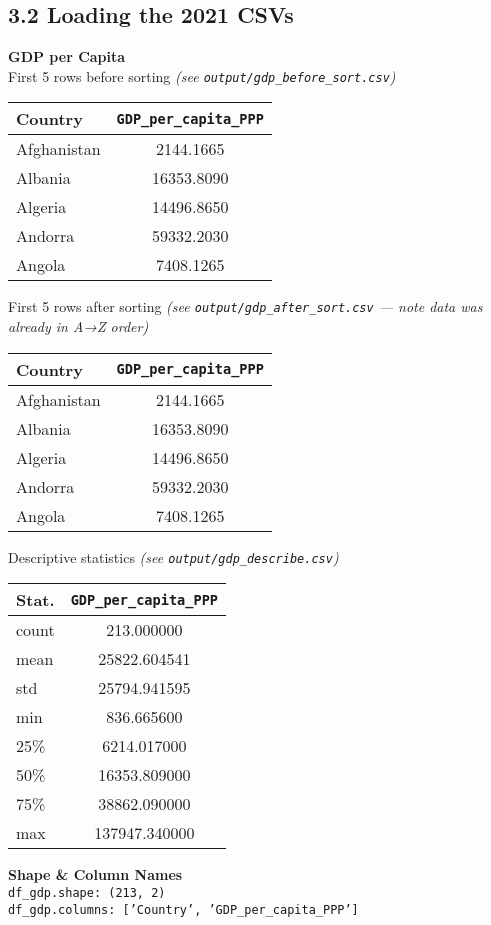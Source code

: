 \documentclass[14pt]{extarticle}
\begin{document}
\subsection*{3.2 Loading the 2021 CSVs}
\textbf{GDP per Capita}\\
First 5 rows before sorting \textit{(see \texttt{output/gdp\_before\_sort.csv})}
\begin{center}
  \begin{tabular}{ |l|c| }
    \hline
    Country &\texttt{GDP\_per\_capita\_PPP}\\
    \hline
    Afghanistan &2144.1665        \\
    Albania &16353.8090           \\
    Algeria &14496.8650           \\
    Andorra &59332.2030           \\
    Angola &7408.1265             \\
    \hline
  \end{tabular}
\end{center}
First 5 rows after sorting \textit{(see \texttt{output/gdp\_after\_sort.csv} — note data was already in A→Z order)}
\begin{center}
  \begin{tabular}{ |l|c| }
    \hline
    Country &\texttt{GDP\_per\_capita\_PPP}\\
    \hline
    Afghanistan &2144.1665        \\
    Albania &16353.8090           \\
    Algeria &14496.8650           \\
    Andorra &59332.2030           \\
    Angola &7408.1265             \\
    \hline
  \end{tabular}
\end{center}
Descriptive statistics \textit{(see \texttt{output/gdp\_describe.csv})}
\begin{center}
  \begin{tabular}{ |l|c| }
    \hline
    Stat.&\texttt{GDP\_per\_capita\_PPP}\\\hline
    count & 213.000000  \\
    mean & 25822.604541 \\
    std & 25794.941595  \\
    min & 836.665600    \\
    25\% & 6214.017000  \\
    50\% & 16353.809000 \\
    75\% & 38862.090000 \\
    max & 137947.340000 \\
    \hline
  \end{tabular}
\end{center}
\textbf{Shape \& Column Names}\\
{\footnotesize\texttt{df\_gdp.shape: (213, 2)\\
df\_gdp.columns: ['Country', 'GDP\_per\_capita\_PPP']}}
\end{document}

